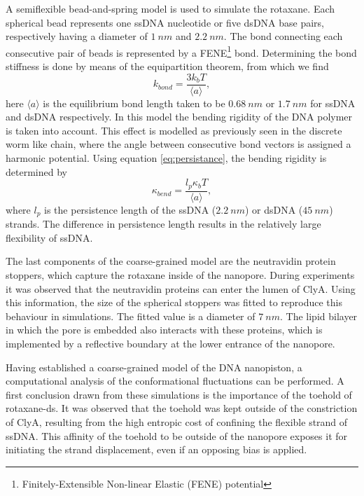 A semiflexible bead-and-spring model is used to simulate the rotaxane. Each spherical
bead represents one ssDNA nucleotide or five dsDNA base pairs, respectively having a
diameter of $1\ nm$ and  $2.2\ nm$. The bond connecting each consecutive pair of beads is
represented by a FENE\footnote{Finitely-Extensible Non-linear
Elastic (FENE) potential} bond.  Determining the bond stiffness is done by
means of the equipartition theorem, from which we find
  \begin{equation}
    k_{bond} = \frac{3 k_b T }{ \langle a \rangle},
  \end{equation}
here $\langle a \rangle$ is the equilibrium bond length taken to be $0.68\ nm$ or $1.7\
nm$ for ssDNA and dsDNA respectively. In this model the bending rigidity of the DNA
polymer is taken into account. This effect is modelled as previously seen in the discrete
worm like chain, where the angle between consecutive bond vectors is assigned a harmonic
potential. Using equation \ref{eq:persistance}, the bending rigidity is determined by
  \begin{equation}
    \kappa_{bend} = \frac{l_{p} \kappa_b T}{\langle a \rangle},
  \end{equation}
  where $l_p$ is the persistence length of the ssDNA ($2.2\ nm$) or dsDNA ($45\ nm$)
strands. The difference in persistence length results in the relatively large flexibility
of ssDNA.

The last components of the coarse-grained model are the neutravidin protein stoppers,
which capture the rotaxane inside of the nanopore. During experiments it was observed
that the neutravidin proteins can enter the lumen of ClyA. Using this information, the
size of the spherical stoppers was fitted to reproduce this behaviour in simulations.
The fitted value is a diameter of $7\ nm$. The lipid bilayer in which the pore is
embedded also interacts with these proteins, which is implemented by a reflective
boundary at the lower entrance of the nanopore.

Having established a coarse-grained model of the DNA nanopiston, a computational analysis
of the conformational fluctuations can be performed. A first conclusion drawn from these
simulations is the importance of the toehold of rotaxane-ds. It was observed
that the toehold was kept outside of the constriction of ClyA, resulting from the high
entropic cost of confining the flexible strand of ssDNA. This affinity of the toehold to
be outside of the nanopore exposes it for initiating the strand displacement, even if an
opposing bias is applied.

